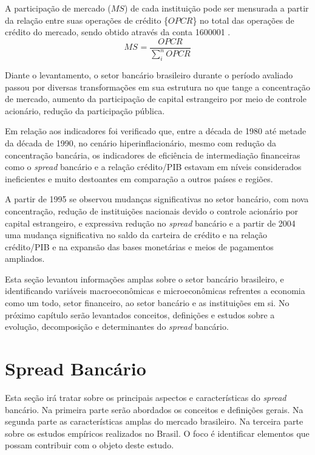 \documentclass[12pt,12pt,openright,oneside,a4paper,chapter=TITLE,section=TITLE,subsection=TITLE,subsubsection=TITLE,english,french,spanish,portugues,sumario=tradicional]{abntex2}
\begin{document}
A participação de mercado (\(MS\)) de cada instituição pode ser mensurada a partir da relação entre suas operações de crédito \{\(OPCR\)\} no total das operações de crédito do mercado, sendo obtido através da conta 1600001 \cite{dantas:2012}.
\[
MS_{} = \frac{OPCR_{}}{\sum_{i}^{n}OPCR_{}} 
\]

Diante o levantamento, o setor bancário brasileiro durante o período avaliado
passou por diversas transformações em sua estrutura no que tange a concentração
de mercado, aumento da participação de capital estrangeiro por meio de controle
acionário, redução da participação pública.

Em relação aos indicadores foi verificado que, entre a década de 1980 até metade da década de 1990, no cenário hiperinflacionário, mesmo com redução da
concentração bancária, os indicadores de eficiência de intermediação
financeiras como o \emph{spread} bancário e a relação crédito/PIB estavam em níveis
considerados ineficientes e muito destoantes em comparação a outros países e
regiões.

A partir de 1995 se observou mudanças significativas no setor bancário, com
nova concentração, redução de instituições nacionais devido o controle
acionário por capital estrangeiro, e expressiva redução no \emph{spread} bancário e
a partir de 2004 uma mudança significativa no saldo da carteira de crédito e na relação crédito/PIB e na expansão das bases monetárias e meios de pagamentos ampliados.

Esta seção levantou informações amplas sobre o setor bancário brasileiro, e
identificando variáveis macroeconômicas e microeconômicas refrentes a economia como um todo, setor financeiro, ao setor bancário e as instituições em si. No próximo capítulo serão levantados conceitos, definições e estudos sobre a evolução, decomposição e determinantes do \emph{spread} bancário.

\textual
\pagestyle{simple}

\section{Spread Bancário}

Esta seção irá tratar sobre os principais aspectos e características do
\emph{spread} bancário. Na primeira parte serão abordados os conceitos e definições
gerais. Na segunda parte as características amplas do mercado brasileiro. Na
terceira parte sobre os estudos empíricos realizados no Brasil. O foco é
identificar elementos que possam contribuir com o objeto deste estudo.
\end{document}
